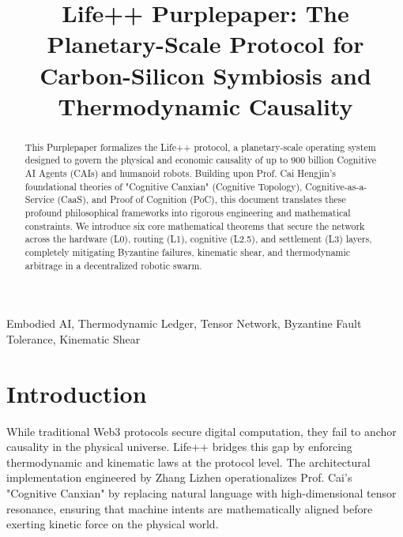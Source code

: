 \documentclass[conference]{IEEEtran}
\begin{document}
\title{Life++ Purplepaper: The Planetary-Scale Protocol for Carbon-Silicon Symbiosis and Thermodynamic Causality}

\author{
\and
{}
}

\maketitle

\begin{abstract}
This Purplepaper formalizes the Life++ protocol, a planetary-scale operating system designed to govern the physical and economic causality of up to 900 billion Cognitive AI Agents (CAIs) and humanoid robots. Building upon Prof. Cai Hengjin's foundational theories of "Cognitive Canxian" (Cognitive Topology), Cognitive-as-a-Service (CaaS), and Proof of Cognition (PoC), this document translates these profound philosophical frameworks into rigorous engineering and mathematical constraints. We introduce six core mathematical theorems that secure the network across the hardware (L0), routing (L1), cognitive (L2.5), and settlement (L3) layers, completely mitigating Byzantine failures, kinematic shear, and thermodynamic arbitrage in a decentralized robotic swarm.
\end{abstract}

\begin{IEEEkeywords}
Embodied AI, Thermodynamic Ledger, Tensor Network, Byzantine Fault Tolerance, Kinematic Shear
\end{IEEEkeywords}

\section{Introduction}
While traditional Web3 protocols secure digital computation, they fail to anchor causality in the physical universe. Life++ bridges this gap by enforcing thermodynamic and kinematic laws at the protocol level. The architectural implementation engineered by Zhang Lizhen operationalizes Prof. Cai's "Cognitive Canxian" by replacing natural language with high-dimensional tensor resonance, ensuring that machine intents are mathematically aligned before exerting kinetic force on the physical world.
\end{document}
